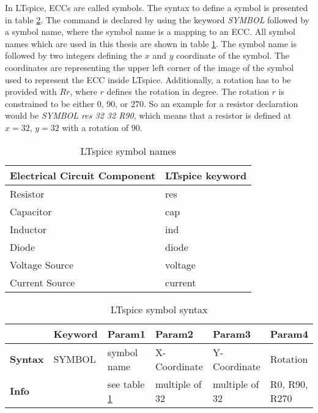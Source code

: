 In LTspice, \acp{ECC} are called symbols.
The syntax to define a symbol is presented in table \ref{tab:ltsymbol_syntax}.
The command is declared by using the keyword \textit{SYMBOL} followed by a symbol name, where the symbol name is a mapping to an \ac{ECC}.
All symbol names which are used in this thesis are shown in table \ref{tab:ltsymbol_mapping}.
The symbol name is followed by two integers defining the $x$ and $y$ coordinate of the symbol.
The coordinates are representing the upper left corner of the image of the symbol used to represent the \ac{ECC} inside LTspice.
Additionally, a rotation has to be provided with $Rr$, where $r$ defines the rotation in degree.
The rotation $r$ is constrained to be either $0$\textdegree, $90$\textdegree, or $270$\textdegree.
So an example for a resistor declaration would be \textit{SYMBOL res 32 32 R90}, which means that a resistor is defined at $x = 32$, $y = 32$ with a rotation of $90$\textdegree.

\begin{table}[H]
\begin{center}

\begin{tabular}{l|l}
    \textbf{Electrical Circuit Component} & \textbf{LTspice keyword}\\
    \hline
    Resistor & res\\
    Capacitor & cap\\
    Inductor & ind\\
    Diode & diode\\
    Voltage Source & voltage\\
    Current Source & current
\end{tabular}
\caption{LTspice symbol names}
\label{tab:ltsymbol_mapping}

\end{center}
\end{table}

\begin{table}[H]
\begin{center}

\begin{tabular}{l|l|l|l|l|l}
    & \textbf{Keyword} & \textbf{Param1} & \textbf{Param2} & \textbf{Param3} & \textbf{Param4}\\
    \hline
    \textbf{Syntax} & SYMBOL & symbol name & X-Coordinate & Y-Coordinate & Rotation\\
    \textbf{Info} & & see table \ref{tab:ltsymbol_mapping} & multiple of 32 & multiple of 32 & R0, R90, R270
\end{tabular}
\caption{LTspice symbol syntax}
\label{tab:ltsymbol_syntax}

\end{center}
\end{table}

